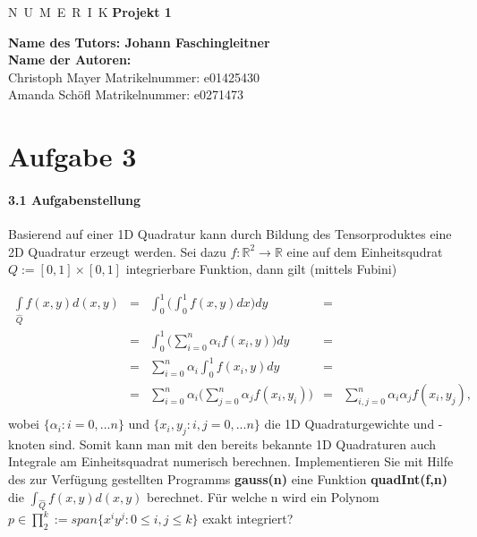 \documentclass[a4paper,11pt,bibliography=totoc,listof=totoc,headinclude=true,cleardoublepage=empty,oneside]{scrbook}
\begin{document}

\begin{titlepage}
	\begin{center}
		\vskip 1cm%
		{\LARGE N~\Large U~M~E~R~I~K}
		\vskip 8mm
		{\huge\bfseries Projekt 1}
		\vskip 1cm
		
		{\Large\bfseries Name des Tutors: Johann Faschingleitner}\\[1ex]
		\vskip 0.5cm
		{\Large\bfseries Name der Autoren:}\\[1ex]
		\vskip 0.5cm
		Christoph Mayer
		\vskip 0.5cm
		Matrikelnummer: e01425430\\[1ex]
		\vskip 0.5cm
		Amanda Schöfl
		\vskip 0.5cm
		Matrikelnummer: e0271473\\[1ex]
	\end{center}
\end{titlepage}

\cleardoublepage
	
\chapter*{Aufgabe 3} %
\thispagestyle{empty}

\subsubsection{3.1 Aufgabenstellung}
Basierend auf einer 1D Quadratur kann durch Bildung des Tensorproduktes eine 2D Quadratur erzeugt werden. Sei dazu $f:	\mathbb{R} ^2 \to \mathbb{R}$ eine auf dem Einheitsqudrat $Q:=[0,1]\times[0,1]$ integrierbare Funktion, dann gilt (mittels Fubini)
		
\begin{equation}\label{equ:integral}
\begin{array}{rccll}
	\int\limits_{\hat{Q}}f(x,y)d(x,y)&=&\int_0^{1}\Big(\int_0^{1}f(x,y)dx\Big)dy&=&\\
	&=&\int_0^{1}\Big(\sum_{i=0}^n\alpha_i f(x_i,y)\Big)dy &=&\\ 
	&=&\sum_{i=0}^n \alpha_i \int_0^{1} f(x_i,y)dy&=&\\
	&=&\sum_{i=0}^{n} \alpha_i\Big(\sum_{j=0}^{n} \alpha_j f(x_i,y_i)\Big)&=&\sum_{i,j=0}^{n} \alpha_i\alpha_j f(x_i,y_j),\\
\end{array}
\end{equation}
wobei $\{\alpha_i: i=0,...n\}$ und  $\{x_i,y_j : i,j=0,...n\}$ die 1D Quadraturgewichte und -knoten sind. Somit kann man mit den bereits bekannte 1D Quadraturen auch Integrale am Einheitsquadrat numerisch berechnen. Implementieren Sie mit Hilfe des zur Verfügung gestellten Programms \textbf{gauss(n)} eine Funktion \textbf{quadInt(f,n)} die $\int_{\hat{Q}}f(x,y)d(x,y) $ berechnet. Für welche n wird ein Polynom $ p \in \prod_{2}^k:=span\{x^iy^j:0 \leq i,j\leq k \} $ exakt integriert?
\end{document}
